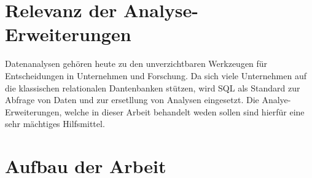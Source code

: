 \section{Relevanz der Analyse-Erweiterungen}
Datenanalysen gehören heute zu den unverzichtbaren Werkzeugen für Entscheidungen
in Unternehmen und Forschung. Da sich viele Unternehmen auf die klassischen
relationalen Dantenbanken stützen, wird SQL als Standard zur Abfrage von Daten und
zur ersetllung von Analysen eingesetzt. Die Analye-Erweiterungen, welche in dieser
Arbeit behandelt weden sollen sind hierfür eine sehr mächtiges Hilfsmittel.


\section{Aufbau der Arbeit}
